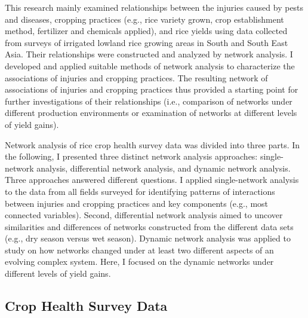 This research mainly examined relationships between the injuries caused by pests and diseases, cropping practices (e.g., rice variety grown, crop establishment method, fertilizer and chemicals applied), and rice yields using data collected from surveys of irrigated lowland rice growing areas in South and South East Asia. Their relationships were constructed and analyzed by network analysis. I developed and applied suitable methods of network analysis to characterize the associations of injuries and cropping practices. The resulting network of associations of injuries and cropping practices thus provided a starting point for further investigations of their relationships (i.e., comparison of networks under different production environments or examination of networks at different levels of yield gains). 

Network analysis of rice crop health survey data was divided into three parts. In the following, I presented three distinct network analysis approaches: single-network analysis, differential network analysis, and dynamic network analysis. Three approaches answered different questions. I applied single-network analysis to the data from all fields surveyed for identifying patterns of interactions  between injuries and cropping practices and key components (e.g., most connected variables). Second, differential network analysis aimed to uncover similarities and differences of networks constructed from the different data sets (e.g., dry season versus wet season). Dynamic network analysis was applied to study on how networks changed under at least two different aspects of an evolving complex system. Here, I focused on the dynamic networks under different levels of yield gains. 

\subsection*{Crop Health Survey Data}


